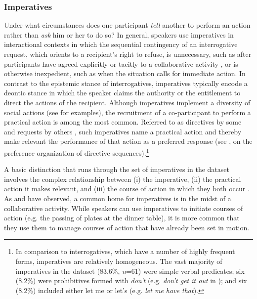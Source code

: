 \documentclass[output=paper,nonflat,modfont,draft]{langsci/langscibook}
\begin{document}
\subsubsection{Imperatives}\label{sec:kendrick:4.2.2}
Under what circumstances does one participant \textit{tell} another to perform an action rather than \textit{ask} him or her to do so? In general, speakers use imperatives in interactional contexts in which the sequential contingency of an interrogative request, which orients to a recipient’s right to refuse, is unnecessary, such as after participants have agreed explicitly or tacitly to a collaborative activity \citep{Wootton1997, Rossi2012, ZinkenOgiermann2013}, or is otherwise inexpedient, such as when the situation calls for immediate action. In contrast to the epistemic stance of interrogatives, imperatives typically encode a deontic stance in which the speaker claims the authority \citep{StevanovicPerakyla2012, StevanovicPerakyla2014} or the entitlement \citep{CravenPotter2010} to direct the actions of the recipient. Although imperatives implement a diversity of social actions (see  for examples), the recruitment of a co-participant to perform a practical action is among the most common. Referred to as directives by some \citep{Goodwin2006, Kent2011, kent_compliance_2012} and  requests by others \citep{Rossi2012, couper-kuhlen_what_2014}, such imperatives name a practical action and thereby make relevant the performance of that action as a preferred response (see \citealt{Kent2011}, on the preference organization of directive sequences).\footnote{In comparison to interrogatives, which have a number of highly frequent forms, imperatives are relatively homogeneous. The vast majority of imperatives in the dataset (83.6\%, \textit{n}=61) were simple verbal predicates; six (8.2\%) were prohibitives formed with \textit{don’t} (e.g. \textit{don’t get it out} in ); and six (8.2\%) included either let me or let’s (e.g. \textit{let me have that}).}

A basic distinction that runs through the set of imperatives in the dataset involves the complex relationship between (i) the imperative, (ii) the practical action it makes relevant, and (iii) the course of action in which they both occur \citep[see][]{KentKendrick2016}. As \citet{Wootton1997} and \citet{Rossi2012} have observed, a common home for imperatives is in the midst of a collaborative activity. While speakers can use imperatives to initiate courses of action (e.g. the passing of plates at the dinner table), it is more common that they use them to manage courses of action that have already been set in motion.
\end{document}
